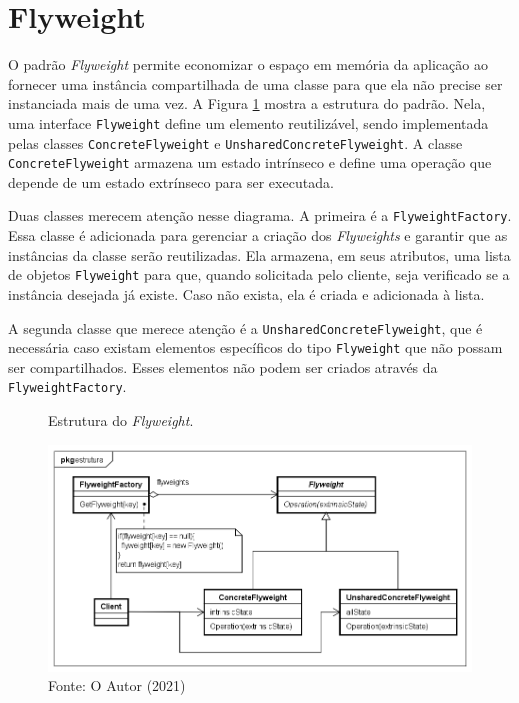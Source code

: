 \section{Flyweight}

O padrão \textit{Flyweight} permite economizar o espaço em memória 
da aplicação ao fornecer uma instância compartilhada de 
uma classe para que ela não precise ser instanciada 
mais de uma vez. A Figura \ref{flyweight_struct} mostra 
a estrutura do padrão. Nela, uma interface \texttt{Flyweight} 
define um elemento reutilizável, sendo implementada 
pelas classes \texttt{ConcreteFlyweight} e \texttt{UnsharedConcreteFlyweight}. 
A classe \texttt{ConcreteFlyweight} armazena um estado intrínseco 
e define uma operação que depende de um estado extrínseco 
para ser executada. \cite{gamma:1995}

Duas classes merecem atenção nesse diagrama. A primeira 
é a \texttt{FlyweightFactory}. Essa classe é adicionada para 
gerenciar a criação dos \textit{Flyweights} e garantir que as 
instâncias da classe serão reutilizadas. Ela armazena, em 
seus atributos, uma lista de objetos \texttt{Flyweight} para que,  
quando solicitada pelo cliente, seja verificado se a instância 
desejada já existe. Caso não exista, ela é criada e 
adicionada à lista. 

A segunda classe que merece atenção é a \texttt{UnsharedConcreteFlyweight}, 
que é necessária caso existam elementos específicos 
do tipo \texttt{Flyweight} que não possam ser compartilhados. 
Esses elementos não podem ser criados através da 
\texttt{FlyweightFactory}.

\begin{figure}[htb]
	\caption{\label{flyweight_struct}Estrutura do \textit{Flyweight}.}
	\begin{center}
	    \includegraphics[scale=0.5]{5_padroes-contexto-funcional/5.2_estruturais/5.2.6_flyweight/flyweight_estrutura.png}
	\end{center}
  \caption*{Fonte: O Autor (2021)}
\end{figure}


